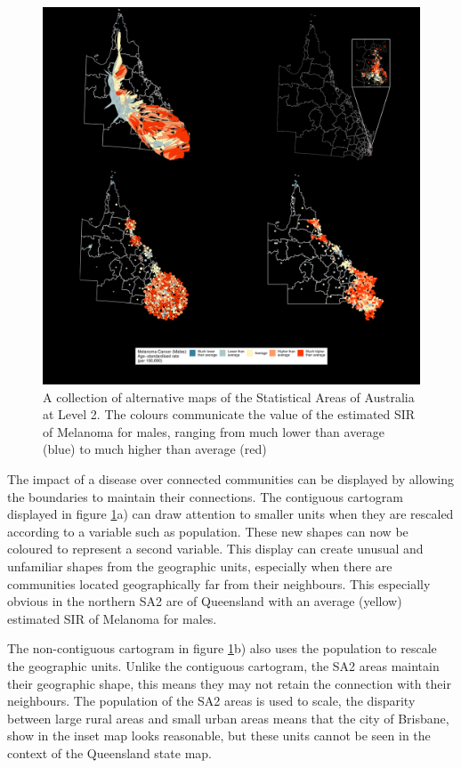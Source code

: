 \documentclass{monashthesis}
\begin{document}
\begin{figure}[H]
\centering
\includegraphics[width=14cm]{figures/03-algorithm/qld_grid.pdf}
\caption{\label{fig:qld_grid}A collection of alternative maps of the Statistical Areas of Australia at Level 2. The colours communicate the value of the estimated SIR of Melanoma for males, ranging from much lower than average (blue) to much higher than average (red)}
\end{figure}

The impact of a disease over connected communities can be displayed by allowing the boundaries to maintain their connections. The contiguous cartogram displayed in figure \ref{fig:qld_grid}a) can draw attention to smaller units when they are rescaled according to a variable such as population. These new shapes can now be coloured to represent a second variable. This display can create unusual and unfamiliar shapes from the geographic units, especially when there are communities located geographically far from their neighbours. This especially obvious in the northern SA2 are of Queensland with an average (yellow) estimated SIR of Melanoma for males.

The non-contiguous cartogram in figure \ref{fig:qld_grid}b) also uses the population to rescale the geographic units. Unlike the contiguous cartogram, the SA2 areas maintain their geographic shape, this means they may not retain the connection with their neighbours. The population of the SA2 areas is used to scale, the disparity between large rural areas and small urban areas means that the city of Brisbane, show in the inset map looks reasonable, but these units cannot be seen in the context of the Queensland state map.
\end{document}
